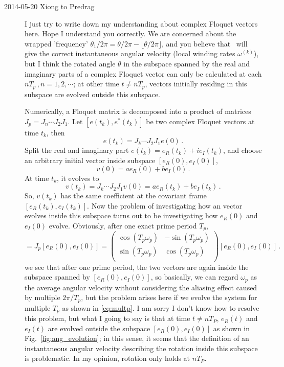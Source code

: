 \begin{description}
\item[2014-05-20 Xiong to Predrag] I just try to write down my
understanding about complex Floquet vectors here. Hope I understand you
correctly. We are concerned about the wrapped 'frequency'
$\theta_1/2\pi = \theta/2\pi - \lfloor\theta/2\pi \rfloor$, and you believe
that \ped\ will give the correct
instantaneous angular velocity (local winding rates $\omega^{(k)}$),
but I think the rotated angle $\theta$ in the subspace spanned by the real
and imaginary parts of a complex Floquet vector can only be calculated at
each $nT_p\,, n=1,2,\cdots$; at other time $t\neq nT_p$, vectors initially
residing in this subspace are evolved outside this subspace.

Numerically, a Floquet matrix is decomposed into a product of matrices
$J_p=J_n\cdots J_2J_1$. Let $[e(t_k), e^*(t_k)]$ be two complex Floquet
vectors at time $t_k$, then
\[
e(t_k)=J_k\cdots J_2J_1 e(0)
\,.
\]
Split the real and imaginary part $e(t_k)=e_R(t_k)+ie_I(t_k)$, and choose
an arbitrary initial vector inside subspace $[e_R(0),e_I(0)]$,
\[
v(0)=ae_R(0)+be_I(0)
\,.
\]
At time $t_k$, it evolves to
\[
v(t_k)=J_k\cdots J_2J_1 v(0)
=ae_R(t_k)+be_I(t_k)
\,.
\]
So, $v(t_k)$ has the same coefficient at the covariant frame
$[e_R(t_k),e_I(t_k)]$. Now the problem of investigating how
an vector evolves inside this subspace turns out to be investigating
how $e_R(0)$ and $e_I(0)$ evolve.
Obviously, after one exact prime period $T_p$,
\begin{equation}
[e_R(T_p),e_I(T_p)]=J_p [e_R(0),e_I(0)]=
\begin{pmatrix}
  \cos(T_p\omega_p) & -\sin(T_p\omega_p) \\
  \sin(T_p\omega_p) & \cos(T_p\omega_p) \\
\end{pmatrix}
[e_R(0),e_I(0)]
\label{eq:accum_ang}
\,.
\end{equation}
we see that after one prime period, the two vectors are again
inside the subspace spanned by $[e_R(0),e_I(0)]$, so basically,
we can regard $\omega_p$ as the average angular velocity
without considering the aliasing effect caused by multiple
$2\pi/T_p$, but the problem arises here if we evolve the system for
multiple $T_p$ as shown in \eqref{eq:multp}. I am sorry I don't know
how to resolve this problem, but what I going to say is that at time
$t\neq nT_P$, $e_R(t)$ and $e_I(t)$ are evolved outside the subspace
 $[e_R(0),e_I(0)]$ as shown in Fig.~\ref{fig:ang_evolution}; in this
sense, it seems that the definition of an instantaneous angular velocity
describing the rotation inside this subspace is problematic.
In my opinion, rotation only holds at $nT_P$.


\end{description}
